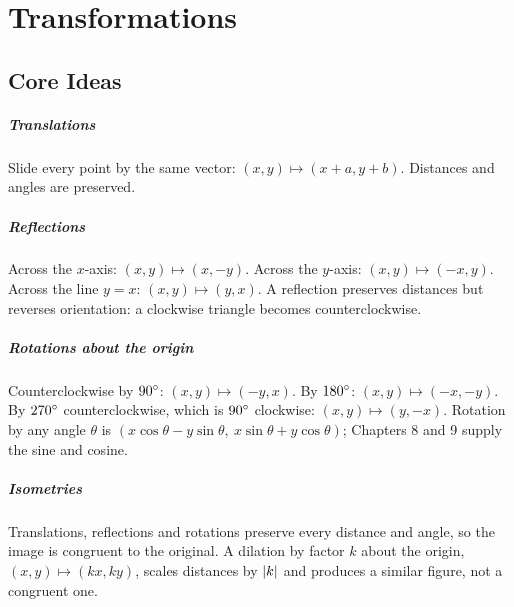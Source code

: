 \chapter{Transformations}


\section{Core Ideas}

\paragraph{Translations} Slide every point by the same vector: $(x, y) \mapsto (x + a, y + b)$. Distances and angles are preserved.

\paragraph{Reflections} Across the $x$-axis: $(x, y) \mapsto (x, -y)$. Across the $y$-axis: $(x, y) \mapsto (-x, y)$. Across the line $y = x$: $(x, y) \mapsto (y, x)$. A reflection preserves distances but reverses orientation: a clockwise triangle becomes counterclockwise.

\paragraph{Rotations about the origin} Counterclockwise by $90^\circ$: $(x, y) \mapsto (-y, x)$. By $180^\circ$: $(x, y) \mapsto (-x, -y)$. By $270^\circ$ counterclockwise, which is $90^\circ$ clockwise: $(x, y) \mapsto (y, -x)$. Rotation by any angle $\theta$ is $(x\cos\theta - y\sin\theta,\ x\sin\theta + y\cos\theta)$; Chapters 8 and 9 supply the sine and cosine.

\paragraph{Isometries} Translations, reflections and rotations preserve every distance and angle, so the image is congruent to the original. A dilation by factor $k$ about the origin, $(x, y) \mapsto (kx, ky)$, scales distances by $\lvert k \rvert$ and produces a similar figure, not a congruent one.

